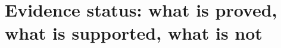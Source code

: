 \documentclass{article}
\begin{document}
\section{Evidence status: what is proved, what is supported, what is not}
\label{sec:conclusion}
\label{app:conclusion}

%
\end{document}
